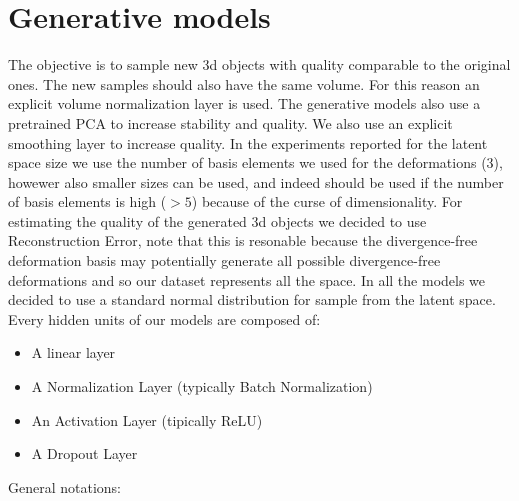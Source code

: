 \documentclass{article}
\begin{document}
\section{Generative models}
The objective is to sample new 3d objects with quality comparable to the original ones. The new samples should also have the same volume.
For this reason an explicit volume normalization layer is used.
The generative models also use a pretrained PCA to increase stability and quality.
We also use an explicit smoothing layer to increase quality.
In the experiments reported for the latent space size we use the number of basis elements we used for the deformations (3), howewer also smaller sizes can be used, and indeed should be used if the number of basis elements is high ($>5$) because of the curse of dimensionality.  
For estimating the quality of the generated 3d objects we decided to use Reconstruction Error, note that this is resonable because the divergence-free deformation basis may potentially generate all possible divergence-free deformations and so our dataset represents all the space.
In all the models we decided to use a standard normal distribution for sample from the latent space.\\
Every hidden units of our models are composed of:
\begin{itemize}
\item A linear layer
\item A Normalization Layer (typically Batch Normalization)
\item An Activation Layer (tipically ReLU)
\item A Dropout Layer
\end{itemize}
$ $\\
General notations:
\end{document}

